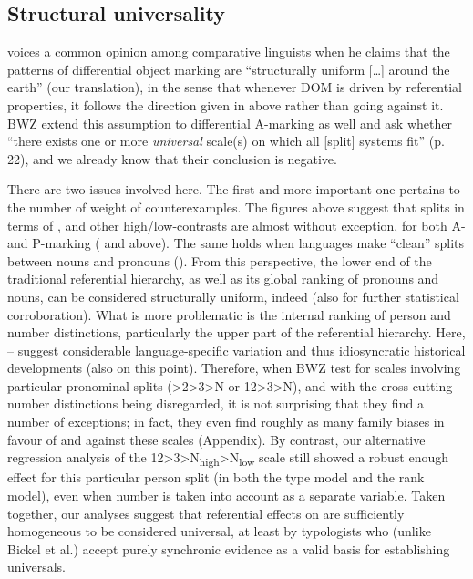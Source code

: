 \documentclass[output=paper]{langscibook}
\begin{document}
\subsection{Structural universality}
\label{18-sc-subsec:4-3}

\citet[VIII]{Bossong1985Differentielle} voices a common opinion among comparative linguists when he claims that the patterns of differential object marking are “structurally uniform […] around the earth” (our translation), in the sense that whenever DOM is driven by referential properties, it follows the direction given in  above rather than going against it. BWZ extend this assumption to differential A-marking as well and ask whether “there exists one or more \textit{universal} scale(s) on which all [split] systems fit” (p.\,22), and we already know that their conclusion is negative.

There are two issues involved here. The first and more important one pertains to the number of weight of counterexamples. The figures above suggest that splits in terms of ,  and other high/low-contrasts are almost without exception, for both A- and P-marking ( and  above). The same holds when languages make “clean” splits between nouns and pronouns (). From this perspective, the lower end of the traditional referential hierarchy, as well as its global ranking of pronouns and nouns, can be considered structurally uniform, indeed (\cf also \citealt{Levshina2017Differential} for further statistical corroboration). What is more problematic is the internal ranking of person and number distinctions, \ie particularly the upper part of the referential hierarchy. Here, -- suggest considerable language-specific variation and thus idiosyncratic historical developments (\cf also \citealt{Filimonova2005Noun} on this point). Therefore, when BWZ test for scales involving particular pronominal splits (>2>3>N or 12>3>N), and with the cross-cutting number distinctions being disregarded, it is not surprising that they find a number of exceptions; in fact, they even find roughly as many family biases in favour of and against these scales (\cf Appendix). By contrast, our alternative regression analysis of the 12>3>N\textsubscript{high}>N\textsubscript{low} scale still showed a robust enough effect for this particular person split (in both the type model and the rank model), even when number is taken into account as a separate variable. Taken together, our analyses suggest that referential effects on  are sufficiently homogeneous to be considered universal, at least by typologists who (unlike Bickel et al.) accept purely synchronic evidence as a valid basis for establishing universals.
\end{document}
